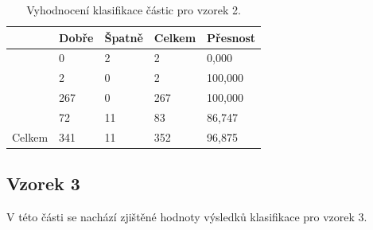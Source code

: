 \documentclass[11pt,twoside,a4paper,table]{book}
\begin{document}
\begin{table}[h]
\begin{center}
\begin{tabular}{lllll}
\rowcolor[HTML]{9B9B9B} 
\multicolumn{1}{|l|}{\cellcolor[HTML]{9B9B9B}Třída} & \multicolumn{1}{l|}{\cellcolor[HTML]{9B9B9B}Dobře} & \multicolumn{1}{l|}{\cellcolor[HTML]{9B9B9B}Špatně}  & \multicolumn{1}{l|}{\cellcolor[HTML]{9B9B9B}Celkem} & \multicolumn{1}{l|}{\cellcolor[HTML]{9B9B9B}Přesnost} \\ \hline
\multicolumn{1}{|l|}{}                              & \multicolumn{1}{l|}{0}                             & \multicolumn{1}{l|}{2}                               & \multicolumn{1}{l|}{2}                              & \multicolumn{1}{l|}{0,000}                            \\ \hline
\multicolumn{1}{|l|}{}                              & \multicolumn{1}{l|}{2}                             & \multicolumn{1}{l|}{0}                               & \multicolumn{1}{l|}{2}                              & \multicolumn{1}{l|}{100,000}                          \\ \hline
\multicolumn{1}{|l|}{}                              & \multicolumn{1}{l|}{267}                           & \multicolumn{1}{l|}{0}                               & \multicolumn{1}{l|}{267}                            & \multicolumn{1}{l|}{100,000}                          \\ \hline
\multicolumn{1}{|l|}{}                              & \multicolumn{1}{l|}{72}                            & \multicolumn{1}{l|}{11}                              & \multicolumn{1}{l|}{83}                             & \multicolumn{1}{l|}{86,747}                           \\ \hline
\multicolumn{1}{|l|}{Celkem}                        & \multicolumn{1}{l|}{341}                           & \multicolumn{1}{l|}{11}                              & \multicolumn{1}{l|}{352}                            & \multicolumn{1}{l|}{96,875}                           \\ \hline
\end{tabular}
\end{center}
\caption{Vyhodnocení klasifikace částic pro vzorek 2.}
\label{tab:classresult2}
\end{table}

\newpage
\FloatBarrier
\subsection{Vzorek 3}
V této části se nachází zjištěné hodnoty výsledků klasifikace pro vzorek 3.
\end{document}
